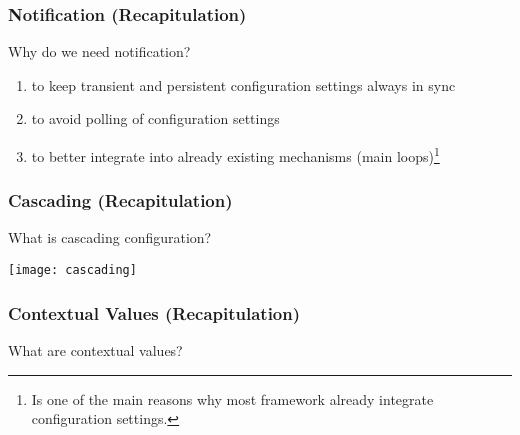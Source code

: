 \begin{frame}
	\frametitle{Notification (Recapitulation)}

	\begin{task}
	Why do we need notification?
	\end{task}

	\pause

	\begin{enumerate}
	\item to keep transient and persistent configuration settings always in sync~\cite{jin2014configurations}
	\item to avoid polling of configuration settings
	\item to better integrate into already existing mechanisms (main loops)\footnote{Is one of the main reasons why most framework already integrate configuration settings.}
	\end{enumerate}

\end{frame}

\begin{frame}
	\frametitle{Cascading (Recapitulation)}

	\begin{task}
	What is cascading configuration?
	\end{task}
	\vspace{1em}

	\pause

	\texttt{[image: cascading]}
\end{frame}

\begin{frame}
	\frametitle{Contextual Values (Recapitulation)}

	\begin{task}
	What are contextual values?
	\end{task}

	\pause

\end{frame}

